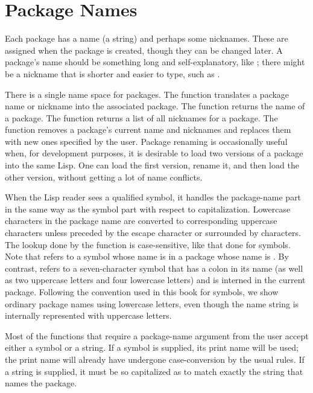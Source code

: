 \section{Package Names}
\label{PACKAGE-NAMES-SECTION}

Each package has a name (a string) and perhaps some nicknames.  These
are assigned when the package is created, though they can be changed
later.  A package's name should be something long and self-explanatory,
like ; there might be a nickname that is shorter and easier to
type, such as .

There is a single name space for packages.  The function
 translates a package name or nickname into the
associated package.  The function  returns the name of a
package.  The function  returns a list of all
nicknames for a package.  The function  removes a
package's current name and nicknames and replaces them with new ones
specified by the user.  Package renaming is occasionally useful when, for
development purposes, it is desirable to load two versions of a package
into the same Lisp.  One can load the first version, rename it,
and then load the other version, without getting a lot of name conflicts.

When the Lisp reader sees a qualified symbol, it handles the package-name
part in the same way as the symbol part with respect to capitalization.
Lowercase characters in the package name are converted to corresponding
uppercase characters
unless preceded by the escape character \cd{{\Xbackslash}} or
surrounded by \cd{|} characters.  The lookup done by the
 function is case-sensitive, like that done for
symbols.  Note that  refers to a symbol whose name is
 in a package whose name is .  By contrast,
 refers to a seven-character symbol that has a colon in its name
(as well as two uppercase letters and four lowercase letters)
and is interned in the current package.  Following the convention used
in this book for symbols, we show ordinary package names using
lowercase letters, even though the name string is internally represented
with uppercase letters.

Most of the functions that require a package-name argument from the
user accept either a symbol or a string.  If a symbol is supplied,
its print name will be used; the print name will already have undergone
case-conversion by the usual rules.  If a string is supplied, it
must be so capitalized as to match exactly the
string that names the package.

